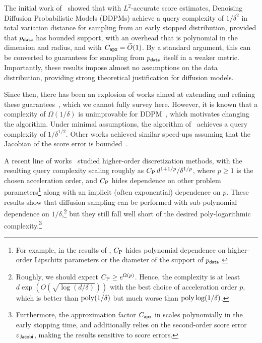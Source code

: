 \documentclass{article} %
\begin{document}
The initial work of~\citet{Chen+23SGM, LeeLuTan23SGMGeneral} showed that with $L^2$-accurate score estimates, Denoising Diffusion Probabilistic Models (DDPMs) achieve a query complexity of $1/\delta^2$ in total variation distance for sampling from an early stopped distribution, provided that $p_{\mathsf{data}}$ has bounded support, with an overhead that is polynomial in the dimension and radius, and with $C_{\texttt{apx}} = \widetilde{O}(1)$.
By a standard argument, this can be converted to guarantees for sampling from $p_{\mathsf{data}}$ itself in a weaker metric.
Importantly, these results impose almost no assumptions on the data distribution, providing strong theoretical justification for diffusion models. 


Since then, there has been an explosion of works aimed at extending and refining these guarantees~\citep[e.g.,][]{chen2023improved,li2023towards,Ben+24Diffusion,gao2025wasserstein,ConDurSil25KLDiffusion, LiYan25Diffusion,Chen+23FlowODE,li2024sharp, GaoZhu25PFODE, huang2025convergence, JaiZha26SharpKL}, which we cannot fully survey here.
However, it is known that a complexity of $\Omega(1/\delta)$ is unimprovable for DDPM~\citep{jiao2025optimal}, which motivates changing the algorithm.
Under minimal assumptions, the algorithm of~\citet{li2024provable} achieves a query complexity of $1/\delta^{1/2}$.
Other works achieved similar speed-ups assuming that the Jacobian of the score error is bounded~\citep{li2024accelerating,li2025faster}.

A recent line of works~\citep[e.g.,][]{huang2025convergence, huang2025fast, li2025faster} studied higher-order discretization methods, with the resulting query complexity scaling roughly as $C_{\rm P}\, d^{1+1/p}/\delta^{1/p}$,
where $p\geq 1$ is the chosen acceleration order, and $C_{\rm P}$ hides dependence on other problem parameters\footnote{For example, in the results of \citet{huang2024reverse,huang2025convergence,huang2025fast}, $C_{\rm P}$ hides polynomial dependence on higher-order Lipschitz parameters or the diameter of the support of $p_{\mathsf{data}}$.} 
along with an implicit (often exponential) dependence on $p$. These results show that diffusion sampling can be performed with sub-polynomial dependence on $1/\delta$,\footnote{
  Roughly, we should expect $C_{\rm P}\geq e^{\Omega(p)}$. Hence, the complexity is at least $d\exp(O(\sqrt{\log(d/\delta)}))$ with the best choice of acceleration order $p$, which is better than $\mathrm{poly}(1/\delta)$ but much worse than $\mathrm{poly}\log(1/\delta)$.
}
but they still fall well short of the desired poly-logarithmic complexity.\footnote{Furthermore, the approximation factor $C_{\texttt{apx}}$ in \citet{huang2025convergence,huang2025fast} scales polynomially in the early stopping time, and \citet{li2025faster} additionally relies on the second-order score error $\varepsilon_{\mathsf{Jacobi}}$, making the results sensitive to score errors.}
\end{document}
